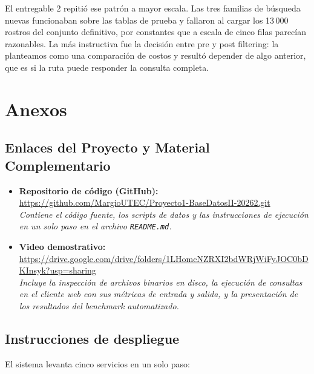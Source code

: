 \documentclass[a4paper,12pt]{article}
\begin{document}
El entregable 2 repitió ese patrón a mayor escala. Las tres familias de búsqueda
nuevas funcionaban sobre las tablas de prueba y fallaron al cargar los 13\,000
rostros del conjunto definitivo, por constantes que a escala de cinco filas
parecían razonables. La más instructiva fue la decisión entre pre y post
filtering: la planteamos como una comparación de costos y resultó depender de
algo anterior, que es si la ruta puede responder la consulta completa.

\newpage
\appendix
\section{Anexos}

\subsection{Enlaces del Proyecto y Material Complementario}

\begin{itemize}
    \item \textbf{Repositorio de código (GitHub):} \\
    \url{https://github.com/MargioUTEC/Proyecto1-BaseDatosII-20262.git} \\
    \textit{Contiene el código fuente, los scripts de datos y las instrucciones
    de ejecución en un solo paso en el archivo \texttt{README.md}.}

    \vspace{0.3cm}

    \item \textbf{Video demostrativo:} \\
    \url{https://drive.google.com/drive/folders/1LHomcNZRXI2bdWRjWiFyJOC0bDKInsyk?usp=sharing} \\
    \textit{Incluye la inspección de archivos binarios en disco, la ejecución de
    consultas en el cliente web con sus métricas de entrada y salida, y la
    presentación de los resultados del benchmark automatizado.}
\end{itemize}

\subsection{Instrucciones de despliegue}

El sistema levanta cinco servicios en un solo paso:
\end{document}

